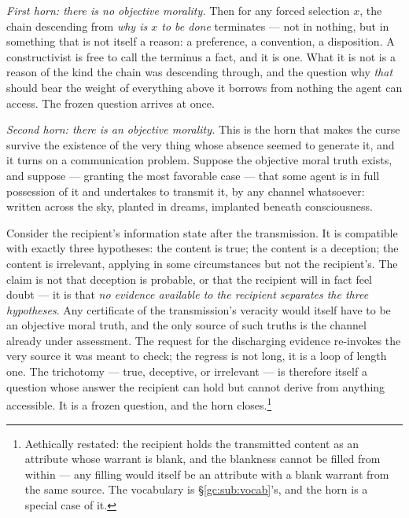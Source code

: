 \documentclass[11pt]{article}
\numberwithin{equation}{section}
\theoremstyle{plain}
\theoremstyle{definition}
\theoremstyle{remark}
\begin{document}
\emph{First horn: there is no objective morality.} Then for any forced selection $x$, the chain descending from \emph{why is $x$ to be done} terminates --- not in nothing, but in something that is not itself a reason: a preference, a convention, a disposition. A constructivist is free to call the terminus a fact, and it is one. What it is not is a reason of the kind the chain was descending through, and the question why \emph{that} should bear the weight of everything above it borrows from nothing the agent can access. The frozen question arrives at once.

\emph{Second horn: there is an objective morality.} This is the horn that makes the curse survive the existence of the very thing whose absence seemed to generate it, and it turns on a communication problem. Suppose the objective moral truth exists, and suppose --- granting the most favorable case --- that some agent is in full possession of it and undertakes to transmit it, by any channel whatsoever: written across the sky, planted in dreams, implanted beneath consciousness.

Consider the recipient's information state after the transmission. It is compatible with exactly three hypotheses: the content is true; the content is a deception; the content is irrelevant, applying in some circumstances but not the recipient's. The claim is not that deception is probable, or that the recipient will in fact feel doubt --- it is that \emph{no evidence available to the recipient separates the three hypotheses}. Any certificate of the transmission's veracity would itself have to be an objective moral truth, and the only source of such truths is the channel already under assessment. The request for the discharging evidence re-invokes the very source it was meant to check; the regress is not long, it is a loop of length one. The trichotomy --- true, deceptive, or irrelevant --- is therefore itself a question whose answer the recipient can hold but cannot derive from anything accessible. It is a frozen question, and the horn closes.\footnote{Aethically restated: the recipient holds the transmitted content as an attribute whose warrant is blank, and the blankness cannot be filled from within --- any filling would itself be an attribute with a blank warrant from the same source. The vocabulary is \S\ref{gc:sub:vocab}'s, and the horn is a special case of it.}%
\end{document}

